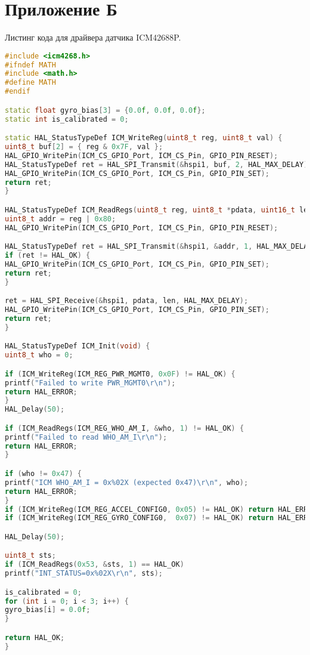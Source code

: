 \chapter{Приложение Б}

Листинг кода для драйвера датчика ICM42688P.

\begin{lstlisting}[language=C++]
#include <icm4268.h>
#ifndef MATH
#include <math.h>
#define MATH
#endif

static float gyro_bias[3] = {0.0f, 0.0f, 0.0f};
static int is_calibrated = 0;

static HAL_StatusTypeDef ICM_WriteReg(uint8_t reg, uint8_t val) {
uint8_t buf[2] = { reg & 0x7F, val }; 
HAL_GPIO_WritePin(ICM_CS_GPIO_Port, ICM_CS_Pin, GPIO_PIN_RESET);
HAL_StatusTypeDef ret = HAL_SPI_Transmit(&hspi1, buf, 2, HAL_MAX_DELAY);
HAL_GPIO_WritePin(ICM_CS_GPIO_Port, ICM_CS_Pin, GPIO_PIN_SET);
return ret;
}

HAL_StatusTypeDef ICM_ReadRegs(uint8_t reg, uint8_t *pdata, uint16_t len) {
uint8_t addr = reg | 0x80;
HAL_GPIO_WritePin(ICM_CS_GPIO_Port, ICM_CS_Pin, GPIO_PIN_RESET);

HAL_StatusTypeDef ret = HAL_SPI_Transmit(&hspi1, &addr, 1, HAL_MAX_DELAY);
if (ret != HAL_OK) {
HAL_GPIO_WritePin(ICM_CS_GPIO_Port, ICM_CS_Pin, GPIO_PIN_SET);
return ret;
}

ret = HAL_SPI_Receive(&hspi1, pdata, len, HAL_MAX_DELAY);
HAL_GPIO_WritePin(ICM_CS_GPIO_Port, ICM_CS_Pin, GPIO_PIN_SET);
return ret;
}

HAL_StatusTypeDef ICM_Init(void) {
uint8_t who = 0;

if (ICM_WriteReg(ICM_REG_PWR_MGMT0, 0x0F) != HAL_OK) {
printf("Failed to write PWR_MGMT0\r\n");
return HAL_ERROR;
}
HAL_Delay(50);

if (ICM_ReadRegs(ICM_REG_WHO_AM_I, &who, 1) != HAL_OK) {
printf("Failed to read WHO_AM_I\r\n");
return HAL_ERROR;
}

if (who != 0x47) {
printf("ICM WHO_AM_I = 0x%02X (expected 0x47)\r\n", who);
return HAL_ERROR;
}
if (ICM_WriteReg(ICM_REG_ACCEL_CONFIG0, 0x05) != HAL_OK) return HAL_ERROR;
if (ICM_WriteReg(ICM_REG_GYRO_CONFIG0,  0x07) != HAL_OK) return HAL_ERROR;

HAL_Delay(50);

uint8_t sts;
if (ICM_ReadRegs(0x53, &sts, 1) == HAL_OK)
printf("INT_STATUS=0x%02X\r\n", sts);

is_calibrated = 0;
for (int i = 0; i < 3; i++) {
gyro_bias[i] = 0.0f;
}

return HAL_OK;
}


\end{lstlisting}
